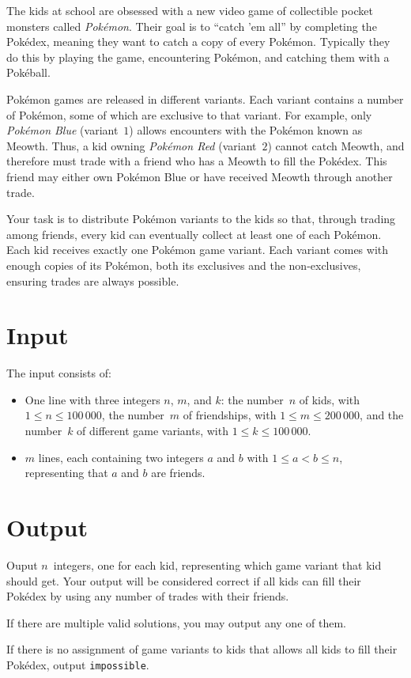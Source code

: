 
The kids at school are obsessed with a new video game of collectible pocket monsters called \emph{Pokémon}.
Their goal is to ``catch 'em all'' by completing the Pokédex, meaning they want to catch a copy of every Pokémon.
Typically they do this by playing the game, encountering Pokémon, and catching them with a Pokéball.

Pokémon games are released in different variants.
Each variant contains a number of Pokémon, some of which are exclusive to that variant.
For example, only \emph{Pokémon Blue} (variant~$1$) allows encounters with the Pokémon known as Meowth.
Thus, a kid owning \emph{Pokémon Red} (variant~$2$) cannot catch Meowth, and therefore must trade with a friend who has a Meowth to fill the Pokédex.
This friend may either own Pokémon Blue or have received Meowth through another trade.

Your task is to distribute Pokémon variants to the kids so that, through trading among friends,
every kid can eventually collect at least one of each Pokémon.
Each kid receives exactly one Pokémon game variant.
Each variant comes with enough copies of its Pokémon, both its exclusives and the non-exclusives, ensuring trades are always possible.

\section*{Input}

The input consists of:
\begin{itemize}
  \item
    One line with three integers $n$, $m$, and $k$:
    the number~$n$ of kids, with $1 \leq n \leq 100\,000$,
    the number~$m$ of friendships, with $1 \leq m \leq 200\,000$,
    and the number~$k$ of different game variants, with  $1 \leq k \leq 100\,000$.
  \item
  $m$ lines, each containing two integers $a$ and $b$ with $1\leq a < b \leq n$, representing that $a$ and $b$ are friends.
\end{itemize}

\section*{Output}

Ouput $n$~integers, one for each kid, representing which game variant that kid should get.
Your output will be considered correct if all kids can fill their Pokédex by using any number of trades with their friends.

If there are multiple valid solutions, you may output any one of them.

If there is no assignment of game variants to kids that allows all kids to fill their Pokédex,
output \texttt{impossible}.
